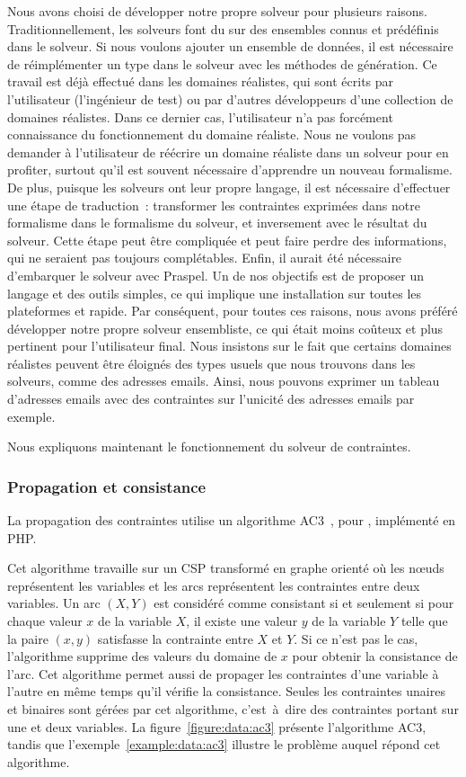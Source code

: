 Nous avons choisi de développer notre propre solveur pour plusieurs raisons.
Traditionnellement, les solveurs font du  sur des ensembles
connus et prédéfinis dans le solveur. Si nous voulons ajouter un ensemble de
données, il est nécessaire de réimplémenter un type dans le solveur avec les
méthodes de génération. Ce travail est déjà effectué dans les domaines
réalistes, qui sont écrits par l'utilisateur (l'ingénieur de test) ou par
d'autres développeurs d'une collection de domaines réalistes. Dans ce dernier
cas, l'utilisateur n'a pas forcément connaissance du fonctionnement du domaine
réaliste. Nous ne voulons pas demander à l'utilisateur de réécrire un domaine
réaliste dans un solveur pour en profiter, surtout qu'il est souvent nécessaire
d'apprendre un nouveau formalisme. De plus, puisque les solveurs ont leur propre
langage, il est nécessaire d'effectuer une étape de traduction~: transformer les
contraintes exprimées dans notre formalisme dans le formalisme du solveur, et
inversement avec le résultat du solveur. Cette étape peut être compliquée et
peut faire perdre des informations, qui ne seraient pas toujours complétables.
Enfin, il aurait été nécessaire d'embarquer le solveur avec Praspel. Un de nos
objectifs est de proposer un langage et des outils simples, ce qui implique une
installation sur toutes les plateformes et rapide. Par conséquent, pour toutes
ces raisons, nous avons préféré développer notre propre solveur ensembliste, ce
qui était moins coûteux et plus pertinent pour l'utilisateur final. Nous
insistons sur le fait que certains domaines réalistes peuvent être éloignés des
types usuels que nous trouvons dans les solveurs, comme des adresses emails.
Ainsi, nous pouvons exprimer un tableau d'adresses emails avec des contraintes
sur l'unicité des adresses emails par exemple.

Nous expliquons maintenant le fonctionnement du solveur de contraintes.

\subsubsection{Propagation et consistance}

La propagation des contraintes utilise un algorithme AC3~,
pour , implémenté en PHP.

Cet algorithme travaille sur un CSP transformé en graphe orienté où les nœuds
représentent les variables et les arcs représentent les contraintes entre deux
variables. Un arc $(X, Y)$ est considéré comme consistant si et seulement si
pour chaque valeur $x$ de la variable $X$, il existe une valeur $y$ de la
variable $Y$ telle que la paire $(x, y)$ satisfasse la contrainte entre $X$ et
$Y$. Si ce n'est pas le cas, l'algorithme supprime des valeurs du domaine de
$x$ pour obtenir la consistance de l'arc. Cet algorithme permet aussi de
propager les contraintes d'une variable à l'autre en même temps qu'il vérifie la
consistance.  Seules les contraintes unaires et binaires sont gérées par cet
algorithme, c'est~à~dire des contraintes portant sur une et deux variables. La
figure~\ref{figure:data:ac3} présente l'algorithme AC3, tandis que
l'exemple~\ref{example:data:ac3} illustre le problème auquel répond cet
algorithme.

